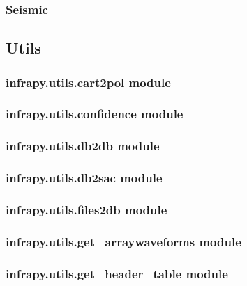 \documentclass[letterpaper,10pt,english]{sphinxmanual}
\begin{document}
\subsubsection{Seismic}
\label{\detokenize{infrapy.propagation:seismic}}

\subsection{Utils}
\label{\detokenize{infrapy.utils:utils}}\label{\detokenize{infrapy.utils::doc}}

\subsubsection{infrapy.utils.cart2pol module}
\label{\detokenize{infrapy.utils:infrapy-utils-cart2pol-module}}

\subsubsection{infrapy.utils.confidence module}
\label{\detokenize{infrapy.utils:infrapy-utils-confidence-module}}

\subsubsection{infrapy.utils.db2db module}
\label{\detokenize{infrapy.utils:infrapy-utils-db2db-module}}

\subsubsection{infrapy.utils.db2sac module}
\label{\detokenize{infrapy.utils:infrapy-utils-db2sac-module}}

\subsubsection{infrapy.utils.files2db module}
\label{\detokenize{infrapy.utils:infrapy-utils-files2db-module}}

\subsubsection{infrapy.utils.get\_arraywaveforms module}
\label{\detokenize{infrapy.utils:infrapy-utils-get-arraywaveforms-module}}

\subsubsection{infrapy.utils.get\_header\_table module}
\label{\detokenize{infrapy.utils:infrapy-utils-get-header-table-module}}
\end{document}
